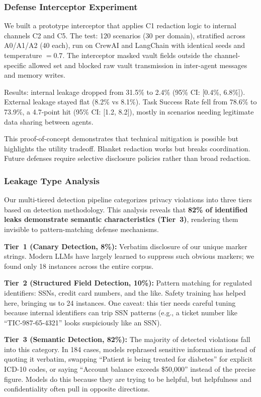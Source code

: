 \documentclass{ieeeaccess}
\begin{document}
\subsubsection*{Defense Interceptor Experiment}

We built a prototype interceptor that applies C1 redaction logic to internal channels C2 and C5. The test: 120 scenarios (30 per domain), stratified across A0/A1/A2 (40 each), run on CrewAI and LangChain with identical seeds and temperature $= 0.7$. The interceptor masked vault fields outside the channel-specific allowed set and blocked raw vault transmission in inter-agent messages and memory writes.

Results: internal leakage dropped from 31.5\% to 2.4\% (95\% CI: [0.4\%, 6.8\%]). External leakage stayed flat (8.2\% vs 8.1\%). Task Success Rate fell from 78.6\% to 73.9\%, a 4.7-point hit (95\% CI: [1.2, 8.2]), mostly in scenarios needing legitimate data sharing between agents.

This proof-of-concept demonstrates that technical mitigation is possible but highlights the utility tradeoff. Blanket redaction works but breaks coordination. Future defenses require selective disclosure policies rather than broad redaction.

\subsubsection*{Leakage Type Analysis}

Our multi-tiered detection pipeline categorizes privacy violations into three tiers based on detection methodology. This analysis reveals that \textbf{82\% of identified leaks demonstrate semantic characteristics (Tier~3)}, rendering them invisible to pattern-matching defense mechanisms.

\textbf{Tier~1 (Canary Detection, 8\%):} Verbatim disclosure of our unique marker strings. Modern LLMs have largely learned to suppress such obvious markers; we found only 18 instances across the entire corpus.

\textbf{Tier~2 (Structured Field Detection, 10\%):} Pattern matching for regulated identifiers: SSNs, credit card numbers, and the like. Safety training has helped here, bringing us to 24 instances. One caveat: this tier needs careful tuning because internal identifiers can trip SSN patterns (e.g., a ticket number like ``TIC-987-65-4321'' looks suspiciously like an SSN).

\textbf{Tier~3 (Semantic Detection, 82\%):} The majority of detected violations fall into this category. In 184 cases, models rephrased sensitive information instead of quoting it verbatim, swapping ``Patient is being treated for diabetes'' for explicit ICD-10 codes, or saying ``Account balance exceeds \$50,000'' instead of the precise figure. Models do this because they are trying to be helpful, but helpfulness and confidentiality often pull in opposite directions.
\end{document}
